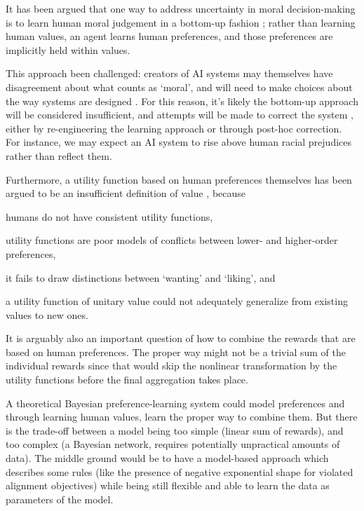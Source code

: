 It has been argued that one way to address uncertainty in moral decision-making is to learn human moral judgement in a bottom-up fashion \cite{bogosian_implementation_2017}; rather than learning human values, an agent learns human preferences, and those preferences are implicitly held within values. 

This approach been challenged: creators of AI systems may themselves have disagreement about what counts as `moral', and will need to make choices about the way systems are designed  \cite{bogosian_implementation_2017}. For this reason, it's likely the bottom-up approach will be considered insufficient, and attempts will be made to correct the system \cite{stray2020you}, either by re-engineering the learning approach or through post-hoc correction. For instance, we may expect an AI system to rise above human racial prejudices rather than reflect them. 

Furthermore, a utility function based on human preferences themselves has been argued to be an insufficient definition of value \cite{sotala2016defining, DBLP:journals/corr/abs-1712-05812}, because \begin{enumerate*}
    \item humans do not have consistent utility functions,
    \item utility functions are poor models of conflicts between lower- and higher-order preferences,
    \item it fails to draw distinctions between `wanting' and `liking', and
    \item a utility function of unitary value could not adequately generalize from existing values to new ones.
\end{enumerate*}
It is arguably also an important question of how to combine the rewards that are based on human preferences. The proper way might not be a trivial sum of the individual rewards since that would skip the nonlinear transformation by the utility functions before the final aggregation takes place. 

A theoretical Bayesian preference-learning system could model preferences and through learning human values, learn the proper way to combine them. But there is the trade-off between a model being too simple (linear sum of rewards), and too complex (a Bayesian network, requires potentially unpractical amounts of data). The middle ground would be to have a model-based approach which describes some rules (like the presence of negative exponential shape for violated alignment objectives) while being still flexible and able to learn the data as parameters of the model.


